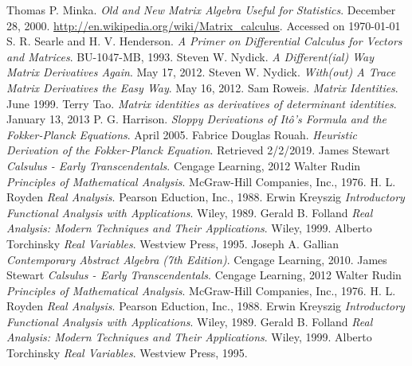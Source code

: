 \documentclass{book}
\begin{document}
\begin{thebibliography}{100}
 Thomas P. Minka. {\em{Old and New Matrix Algebra Useful for Statistics}}. December 28, 2000.
 \url{http://en.wikipedia.org/wiki/Matrix_calculus}. Accessed on \today
{} S. R. Searle and H. V. Henderson. {\em{A Primer on Differential Calculus for Vectors and Matrices}}. BU-1047-MB, 1993.
 Steven W. Nydick. {\em{A Different(ial) Way Matrix Derivatives Again}}. May 17, 2012.
 Steven W. Nydick. {\em{With(out) A Trace Matrix Derivatives the Easy Way}}. May 16, 2012.
 Sam Roweis. {\em{Matrix Identities}}. June 1999.
 Terry Tao. {\em{Matrix identities as derivatives of determinant identities}}. January 13, 2013
 P. G. Harrison. {\em{Sloppy Derivations of It\^o's Formula and the Fokker-Planck Equations}}. April 2005.
 Fabrice Douglas Rouah. {\em{Heuristic Derivation of the Fokker-Planck Equation}}. Retrieved 2/2/2019.
 James Stewart {\em{Calsulus - Early Transcendentals}}. Cengage Learning, 2012
 Walter Rudin {\em{Principles of Mathematical Analysis}}. McGraw-Hill Companies, Inc., 1976.
 H. L. Royden {\em{Real Analysis}}. Pearson Eduction, Inc., 1988.
 Erwin Kreyszig {\em{Introductory Functional Analysis with Applications}}. Wiley, 1989.
 Gerald B. Folland {\em{Real Analysis: Modern Techniques and Their Applications}}. Wiley, 1999.
 Alberto Torchinsky {\em{Real Variables}}. Westview Press, 1995.
 Joseph A. Gallian {\em{Contemporary Abstract Algebra (7th Edition)}}. Cengage Learning, 2010.
 James Stewart {\em{Calsulus - Early Transcendentals}}. Cengage Learning, 2012
 Walter Rudin {\em{Principles of Mathematical Analysis}}. McGraw-Hill Companies, Inc., 1976.
 H. L. Royden {\em{Real Analysis}}. Pearson Eduction, Inc., 1988.
 Erwin Kreyszig {\em{Introductory Functional Analysis with Applications}}. Wiley, 1989.
 Gerald B. Folland {\em{Real Analysis: Modern Techniques and Their Applications}}. Wiley, 1999.
 Alberto Torchinsky {\em{Real Variables}}. Westview Press, 1995.


\end{thebibliography}
\end{document}
